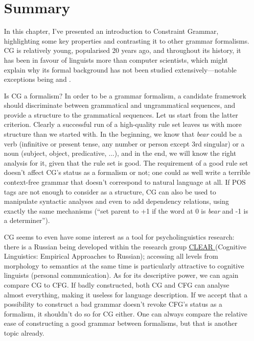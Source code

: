 \section{Summary}

In this chapter, I've presented an introduction to Constraint Grammar,
highlighting some key properties and contrasting it to other grammar
formalisms.
CG is relatively young, popularised 20 years ago, and throughout its
history, it has been in favour of linguists more than computer
scientists, which might explain why its formal background has not been
studied extensively---notable exceptions being \cite{lager98} and \cite{lager_nivre01}.
 
Is CG a formalism? In order to be a grammar formalism, a candidate
framework should discriminate between grammatical and ungrammatical
sequences, and provide a structure to the grammatical sequences.
Let us start from the latter criterion. Clearly a successful run of a
high-quality rule set leaves us with more structure than we started
with. In the beginning, we know that \emph{bear} could be a verb
(infinitive or present tense, any number or person except 3rd
singular) or a noun (subject, object, predicative, ...), and in the end, we
will know the right analysis for it, given that the rule set is
good. The requirement of a good rule set doesn't affect CG's status as
a formalism or not; one could as well write a terrible context-free
grammar that doesn't correspond to natural language at all.
If POS tags are not enough to consider as a structure,
CG can also be used to manipulate syntactic analyses and even to add
dependency relations, using exactly the same mechanisms (``set parent to +1 if the word at 0 is \emph{bear} and -1 is a determiner'').

CG seems to even have some interest as a tool for psycholinguistics research:
there is a Russian being developed within the research group
 \href{https://uit.no/forskning/forskningsgrupper/gruppe?p_document_id=344365}{CLEAR
} (Cognitive Linguistics: Empirical Approaches to Russian); accessing
all levels from morphology to semantics at the same time is particularly attractive to cognitive linguists (personal communication).
As for its descriptive power, we can again compare CG to CFG. If
badly constructed, both CG and CFG can analyse almost everything,
making it useless for language description. If we accept that a
possibility to construct a bad grammar doesn't revoke CFG's status as
a formalism, it shouldn't do so for CG either. One can always compare
the relative ease of constructing a good grammar between formalisms,
but that is another topic already.

